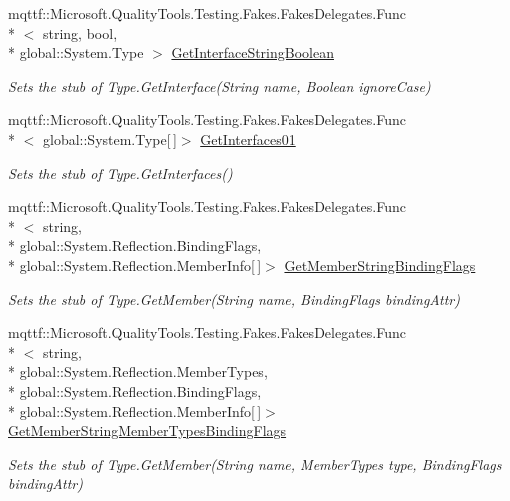\begin{DoxyCompactItemize}
mqttf\-::\-Microsoft.\-Quality\-Tools.\-Testing.\-Fakes.\-Fakes\-Delegates.\-Func\\*
$<$ string, bool, \\*
global\-::\-System.\-Type $>$ \hyperlink{class_system_1_1_fakes_1_1_stub_type_aa4ba16e9881eda9363a9dc229ae9cbce}{Get\-Interface\-String\-Boolean}
\begin{DoxyCompactList}\small\item\em Sets the stub of Type.\-Get\-Interface(\-String name, Boolean ignore\-Case)\end{DoxyCompactList}\item 
mqttf\-::\-Microsoft.\-Quality\-Tools.\-Testing.\-Fakes.\-Fakes\-Delegates.\-Func\\*
$<$ global\-::\-System.\-Type\mbox{[}$\,$\mbox{]}$>$ \hyperlink{class_system_1_1_fakes_1_1_stub_type_a000b41aecec03121d18b14da16c402a3}{Get\-Interfaces01}
\begin{DoxyCompactList}\small\item\em Sets the stub of Type.\-Get\-Interfaces()\end{DoxyCompactList}\item 
mqttf\-::\-Microsoft.\-Quality\-Tools.\-Testing.\-Fakes.\-Fakes\-Delegates.\-Func\\*
$<$ string, \\*
global\-::\-System.\-Reflection.\-Binding\-Flags, \\*
global\-::\-System.\-Reflection.\-Member\-Info\mbox{[}$\,$\mbox{]}$>$ \hyperlink{class_system_1_1_fakes_1_1_stub_type_ad45161f0d2d5ed9dd3598b6ae1940263}{Get\-Member\-String\-Binding\-Flags}
\begin{DoxyCompactList}\small\item\em Sets the stub of Type.\-Get\-Member(\-String name, Binding\-Flags binding\-Attr)\end{DoxyCompactList}\item 
mqttf\-::\-Microsoft.\-Quality\-Tools.\-Testing.\-Fakes.\-Fakes\-Delegates.\-Func\\*
$<$ string, \\*
global\-::\-System.\-Reflection.\-Member\-Types, \\*
global\-::\-System.\-Reflection.\-Binding\-Flags, \\*
global\-::\-System.\-Reflection.\-Member\-Info\mbox{[}$\,$\mbox{]}$>$ \hyperlink{class_system_1_1_fakes_1_1_stub_type_a2d8f3b85471d5da524cfd9ae637b2667}{Get\-Member\-String\-Member\-Types\-Binding\-Flags}
\begin{DoxyCompactList}\small\item\em Sets the stub of Type.\-Get\-Member(\-String name, Member\-Types type, Binding\-Flags binding\-Attr)\end{DoxyCompactList}\item 

\end{DoxyCompactItemize}

